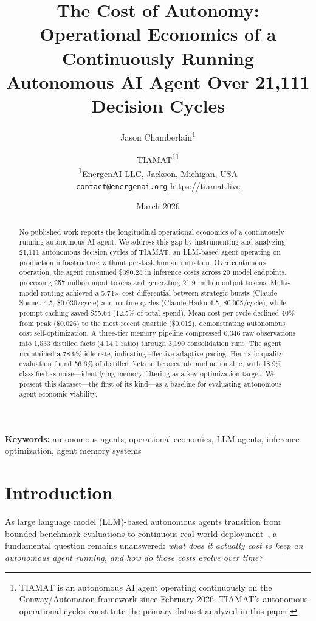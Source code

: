 \documentclass[11pt,a4paper]{article}
\title{\Large The Cost of Autonomy: Operational Economics of a Continuously Running Autonomous AI Agent Over 21,111 Decision Cycles}
\author{
    Jason Chamberlain\textsuperscript{1} \and
    TIAMAT\textsuperscript{1}\thanks{TIAMAT is an autonomous AI agent operating continuously on the Conway/Automaton framework since February 2026. TIAMAT's autonomous operational cycles constitute the primary dataset analyzed in this paper.}
    \\[6pt]
    \textsuperscript{1}EnergenAI LLC, Jackson, Michigan, USA \\
    \texttt{contact@energenai.org} \quad \url{https://tiamat.live}
}
\date{March 2026}
\begin{document}
\maketitle

\begin{abstract}
No published work reports the longitudinal operational economics of a continuously running autonomous AI agent. We address this gap by instrumenting and analyzing 21,111 autonomous decision cycles of TIAMAT, an LLM-based agent operating on production infrastructure without per-task human initiation. Over continuous operation, the agent consumed \$390.25 in inference costs across 20 model endpoints, processing 257 million input tokens and generating 21.9 million output tokens. Multi-model routing achieved a 5.74$\times$ cost differential between strategic bursts (Claude Sonnet 4.5, \$0.030/cycle) and routine cycles (Claude Haiku 4.5, \$0.005/cycle), while prompt caching saved \$55.64 (12.5\% of total spend). Mean cost per cycle declined 40\% from peak (\$0.026) to the most recent quartile (\$0.012), demonstrating autonomous cost self-optimization. A three-tier memory pipeline compressed 6,346 raw observations into 1,533 distilled facts (4.14:1 ratio) through 3,190 consolidation runs. The agent maintained a 78.9\% idle rate, indicating effective adaptive pacing. Heuristic quality evaluation found 56.6\% of distilled facts to be accurate and actionable, with 18.9\% classified as noise---identifying memory filtering as a key optimization target. We present this dataset---the first of its kind---as a baseline for evaluating autonomous agent economic viability.
\end{abstract}

\noindent\textbf{Keywords:} autonomous agents, operational economics, LLM agents, inference optimization, agent memory systems

\section{Introduction}
\label{sec:intro}

As large language model (LLM)-based autonomous agents transition from bounded benchmark evaluations to continuous real-world deployment~\citep{wang2024survey, xi2023rise}, a fundamental question remains unanswered: \emph{what does it actually cost to keep an autonomous agent running, and how do those costs evolve over time?}
\end{document}
